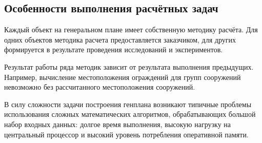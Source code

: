 \subsection{\large{Особенности выполнения расчётных задач}}

Каждый объект на генеральном плане имеет собственную методику расчёта.
Для одних объектов методика расчета предоставляется заказчиком,
для других формируется в результате проведения исследований и экспериментов.

Результат работы ряда методик зависит от результата выполнения предыдущих.
Например, вычисление местоположения ограждений для групп сооружений невозможно без рассчитанного
местоположения сооружений.

В силу сложности задачи построения генплана
возникают типичные проблемы использования сложных математических алгоритмов,
обрабатывающих большой набор входных данных: долгое время выполнения,
высокую нагрузку на центральный процессор и высокий уровень потребления оперативной памяти.

